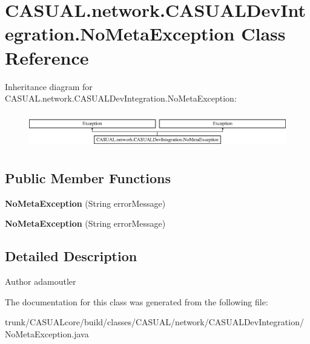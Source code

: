 \hypertarget{class_c_a_s_u_a_l_1_1network_1_1_c_a_s_u_a_l_dev_integration_1_1_no_meta_exception}{\section{C\-A\-S\-U\-A\-L.\-network.\-C\-A\-S\-U\-A\-L\-Dev\-Integration.\-No\-Meta\-Exception Class Reference}
\label{class_c_a_s_u_a_l_1_1network_1_1_c_a_s_u_a_l_dev_integration_1_1_no_meta_exception}
}
Inheritance diagram for C\-A\-S\-U\-A\-L.\-network.\-C\-A\-S\-U\-A\-L\-Dev\-Integration.\-No\-Meta\-Exception\-:\begin{figure}[H]
\begin{center}
\leavevmode
\includegraphics[height=1.568627cm]{class_c_a_s_u_a_l_1_1network_1_1_c_a_s_u_a_l_dev_integration_1_1_no_meta_exception}
\end{center}
\end{figure}
\subsection*{Public Member Functions}
\begin{DoxyCompactItemize}
\item 
\hypertarget{class_c_a_s_u_a_l_1_1network_1_1_c_a_s_u_a_l_dev_integration_1_1_no_meta_exception_af60b9558adbc685475aab320846507f5}{{\bfseries No\-Meta\-Exception} (String error\-Message)}\label{class_c_a_s_u_a_l_1_1network_1_1_c_a_s_u_a_l_dev_integration_1_1_no_meta_exception_af60b9558adbc685475aab320846507f5}

\item 
\hypertarget{class_c_a_s_u_a_l_1_1network_1_1_c_a_s_u_a_l_dev_integration_1_1_no_meta_exception_af60b9558adbc685475aab320846507f5}{{\bfseries No\-Meta\-Exception} (String error\-Message)}\label{class_c_a_s_u_a_l_1_1network_1_1_c_a_s_u_a_l_dev_integration_1_1_no_meta_exception_af60b9558adbc685475aab320846507f5}

\end{DoxyCompactItemize}


\subsection{Detailed Description}
\begin{DoxyAuthor}{Author}
adamoutler 
\end{DoxyAuthor}


The documentation for this class was generated from the following file\-:\begin{DoxyCompactItemize}
\item 
trunk/\-C\-A\-S\-U\-A\-Lcore/build/classes/\-C\-A\-S\-U\-A\-L/network/\-C\-A\-S\-U\-A\-L\-Dev\-Integration/No\-Meta\-Exception.\-java\end{DoxyCompactItemize}

